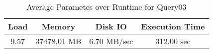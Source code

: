 \documentclass[../../main.tex]{subfiles}
\begin{document}
    \begin{table}
        \begin{center}
            \begin{tabular}{ |c|c|c|c| } 
            \hline
            Load & Memory & Disk IO & Execution Time\\
            \hline
            9.57 & 37478.01 MB & 6.70 MB/sec & 312.00 sec \\
            \hline
            \end{tabular}
            \\[1pt]
            \caption{Average Parametes over Runtime for Query03}
        \end{center}
    \end{table}
    \pagebreak
\end{document}
